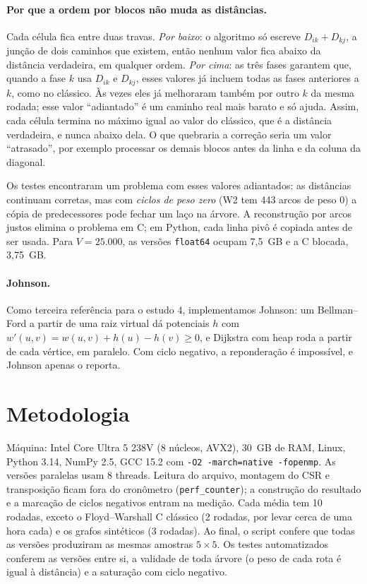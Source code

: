 \documentclass[a4paper,11pt]{article}
\begin{document}
\paragraph{Por que a ordem por blocos não muda as distâncias.} Cada célula fica entre duas travas. \emph{Por baixo}: o algoritmo só escreve \(D_{ik}+D_{kj}\), a junção de dois caminhos que existem, então nenhum valor fica abaixo da distância verdadeira, em qualquer ordem. \emph{Por cima}: as três fases garantem que, quando a fase \(k\) usa \(D_{ik}\) e \(D_{kj}\), esses valores já incluem todas as fases anteriores a \(k\), como no clássico. Às vezes eles já melhoraram também por outro \(k\) da mesma rodada; esse valor ``adiantado'' é um caminho real mais barato e só ajuda. Assim, cada célula termina no máximo igual ao valor do clássico, que é a distância verdadeira, e nunca abaixo dela. O que quebraria a correção seria um valor ``atrasado'', por exemplo processar os demais blocos antes da linha e da coluna da diagonal.

Os testes encontraram um problema com esses valores adiantados: as distâncias continuam corretas, mas com \emph{ciclos de peso zero} (W2 tem 443 arcos de peso 0) a cópia de predecessores pode fechar um laço na árvore. A reconstrução por arcos justos elimina o problema em C; em Python, cada linha pivô é copiada antes de ser usada. Para \(V=25.000\), as versões \texttt{float64} ocupam 7,5~GB e a C blocada, 3,75~GB.

\paragraph{Johnson.} Como terceira referência para o estudo 4, implementamos Johnson: um Bellman--Ford a partir de uma raiz virtual dá potenciais \(h\) com \(w'(u,v)=w(u,v)+h(u)-h(v)\ge0\), e Dijkstra com heap roda a partir de cada vértice, em paralelo. Com ciclo negativo, a reponderação é impossível, e Johnson apenas o reporta.

\section{Metodologia}

Máquina: Intel Core Ultra 5 238V (8 núcleos, AVX2), 30~GB de RAM, Linux, Python 3.14, NumPy 2.5, GCC 15.2 com \texttt{-O2 -march=native -fopenmp}. As versões paralelas usam 8 threads. Leitura do arquivo, montagem do CSR e transposição ficam fora do cronômetro (\texttt{perf\_counter}); a construção do resultado e a marcação de ciclos negativos entram na medição. Cada média tem 10 rodadas, exceto o Floyd--Warshall C clássico (2 rodadas, por levar cerca de uma hora cada) e os grafos sintéticos (3 rodadas). Ao final, o script confere que todas as versões produziram as mesmas amostras \(5\times5\). Os testes automatizados conferem as versões entre si, a validade de toda árvore (o peso de cada rota é igual à distância) e a saturação com ciclo negativo.
\end{document}
